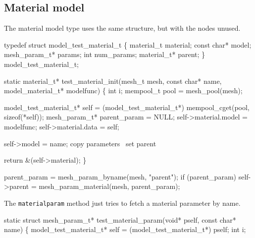 \nwendcode{}\nwdocspar


\subsection{Material model}

The material model type uses the same structure, but with the nodes unused.

\nwenddocs{}\plusendmoddef
typedef struct model_test_material_t \{
    material_t material;
    const char* model;
    mesh_param_t* params;
    int num_params;
    material_t* parent;
\} model_test_material_t;

\nwendcode{}\nwdocspar

\nwenddocs{}\plusendmoddef
static material_t* test_material_init(mesh_t mesh, const char* name,
                                      model_material_t* modelfunc)
\{
    int i;
    mempool_t pool = mesh_pool(mesh);

    model_test_material_t* self = (model_test_material_t*)
        mempool_cget(pool, sizeof(*self));
    mesh_param_t* parent_param = NULL;
    self->material.model = modelfunc;
    self->material.data = self;

    self->model = name;
    \LA{}copy parameters~{\nwtagstyle{}}\RA{}
    \LA{}set parent~{\nwtagstyle{}}\RA{}

    return &(self->material);
\}

\nwendcode{}\nwdocspar

\nwenddocs{}\endmoddef
parent_param = mesh_param_byname(mesh, "parent");
if (parent_param)
    self->parent = mesh_param_material(mesh, parent_param);
\nwendcode{}\nwdocspar

The {\tt{}material{}param} method just tries to fetch a material parameter by name.

\nwenddocs{}\plusendmoddef
static struct mesh_param_t* test_material_param(void* pself, const char* name)
\{
    model_test_material_t* self = (model_test_material_t*) pself;
    int i;

